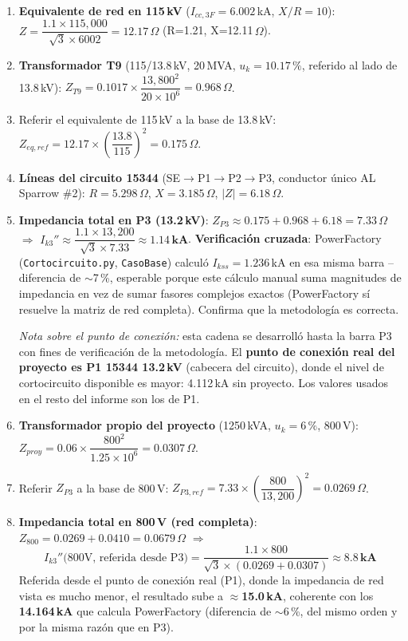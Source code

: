 \documentclass[11pt,a4paper]{article}
\begin{document}
\begin{enumerate}
    \item \textbf{Equivalente de red en 115\,kV} ($I_{cc,3F}=6.002$\,kA, $X/R=10$): $Z = \dfrac{1.1 \times 115{,}000}{\sqrt{3}\times 6002} = 12.17\,\Omega$ (R=1.21, X=12.11\,$\Omega$).
    \item \textbf{Transformador T9} (115/13.8\,kV, 20\,MVA, $u_k=10.17\,\%$, referido al lado de 13.8\,kV): $Z_{T9} = 0.1017 \times \dfrac{13{,}800^2}{20\times10^6} = 0.968\,\Omega$.
    \item Referir el equivalente de 115\,kV a la base de 13.8\,kV: $Z_{eq,ref} = 12.17 \times \left(\dfrac{13.8}{115}\right)^2 = 0.175\,\Omega$.
    \item \textbf{L\'ineas del circuito 15344} (SE$\to$P1$\to$P2$\to$P3, conductor \'unico AL Sparrow \#2): $R=5.298\,\Omega$, $X=3.185\,\Omega$, $|Z|=6.18\,\Omega$.
    \item \textbf{Impedancia total en P3 (13.2\,kV)}: $Z_{P3} \approx 0.175+0.968+6.18 = 7.33\,\Omega$ $\Rightarrow$ $I_{k3}'' \approx \dfrac{1.1\times 13{,}200}{\sqrt{3}\times 7.33} \approx \mathbf{1.14\,kA}$.
    \textbf{Verificaci\'on cruzada}: PowerFactory (\texttt{Cortocircuito.py}, \texttt{CasoBase}) calcul\'o $I_{kss}=1.236$\,kA en esa misma barra -- diferencia de $\sim$7\,\%, esperable porque este c\'alculo manual suma magnitudes de impedancia en vez de sumar fasores complejos exactos (PowerFactory s\'i resuelve la matriz de red completa). Confirma que la metodolog\'ia es correcta.

    \emph{Nota sobre el punto de conexi\'on:} esta cadena se desarroll\'o hasta la barra P3 con fines de verificaci\'on de la metodolog\'ia. El \textbf{punto de conexi\'on real del proyecto es P1 15344 13.2\,kV} (cabecera del circuito), donde el nivel de cortocircuito disponible es mayor: 4.112\,kA sin proyecto. Los valores usados en el resto del informe son los de P1.
    \item \textbf{Transformador propio del proyecto} (1250\,kVA, $u_k=6\,\%$, 800\,V): $Z_{proy} = 0.06\times\dfrac{800^2}{1.25\times10^6} = 0.0307\,\Omega$.
    \item Referir $Z_{P3}$ a la base de 800\,V: $Z_{P3,ref} = 7.33\times\left(\dfrac{800}{13{,}200}\right)^2 = 0.0269\,\Omega$.
    \item \textbf{Impedancia total en 800\,V (red completa)}: $Z_{800} = 0.0269+0.0410 = 0.0679\,\Omega$ $\Rightarrow$
    $$I_{k3}''\text{(800V, referida desde P3)} = \frac{1.1\times800}{\sqrt{3}\times(0.0269+0.0307)} \approx \mathbf{8.8\,kA}$$
    Referida desde el punto de conexi\'on real (P1), donde la impedancia de red vista es mucho menor, el resultado sube a $\approx$\textbf{15.0\,kA}, coherente con los \textbf{14.164\,kA} que calcula PowerFactory (diferencia de $\sim$6\,\%, del mismo orden y por la misma raz\'on que en P3).
\end{enumerate}
\end{document}
